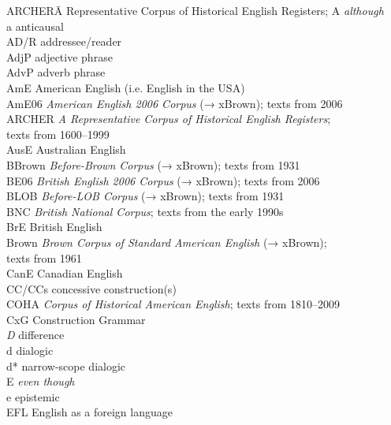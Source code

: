 \addchap{\lsAbbreviationsTitle}
\begin{tabbing}
ARCHER\hspace{.5em}\= A Representative Corpus of Historical English Registers;\kill
A        \> \textit{although}\\
a         \> anticausal\\
AD/R       \> addressee/reader\\
AdjP       \> adjective phrase\\
AdvP       \> adverb phrase\\
{AmE}        \> {American English} (i.e. English in the USA)\\
AmE06      \> \textit{{American English} 2006 Corpus} (→ xBrown); texts from 2006\\
ARCHER     \> \textit{A Representative Corpus of Historical English Registers};\\ \> texts from 1600–1999\\
{AusE}       \> {Australian English}\\
BBrown     \>  \textit{Before-Brown Corpus} (→ xBrown); texts from 1931\\
BE06       \> \textit{British English 2006 Corpus} (→ xBrown); texts from 2006\\
BLOB       \> \textit{Before-LOB Corpus} (→ xBrown); texts from 1931\\
BNC        \> \textit{British National Corpus}; texts from the early 1990s\\
{BrE}        \> {British English}\\
Brown      \> \textit{Brown Corpus of Standard {American English}} (→ xBrown);\\ \> texts from 1961\\
{CanE}       \> {Canadian English}\\
CC/CCs     \> concessive construction(s)\\
COHA       \> \textit{Corpus of Historical {American English}}; texts from 1810–2009\\
CxG        \> Construction Grammar\\
\textit{D} \> difference\\
d         \> dialogic\\
d*         \> narrow-scope dialogic\\
E        \> \textit{even though}\\
e        \> epistemic\\
EFL        \> English as a foreign language\\

\end{tabbing}
